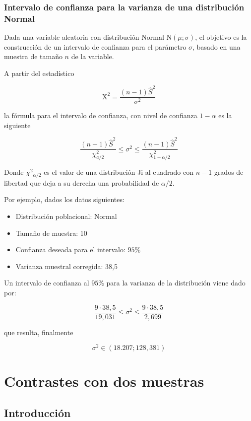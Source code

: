 \documentclass[
]{article}
\providecommand{\tightlist}{%
  \setlength{\itemsep}{0pt}\setlength{\parskip}{0pt}}
\begin{document}
\subsubsection{Intervalo de confianza para la varianza de una distribución Normal}\label{intervalo-de-confianza-para-la-varianza-de-una-distribuciuxf3n-normal-1}

Dada una variable aleatoria con distribución Normal \(\mathrm{N}(\mu ; \sigma)\), el objetivo es la construcción de un intervalo de confianza para el parámetro \(\sigma\), basado en una muestra de tamaño \(n\) de la variable.

A partir del estadístico

\[
\mathrm{X}^{2}=\frac{(n-1) \hat{S}^{2}}{\sigma^{2}}
\]

la fórmula para el intervalo de confianza, con nivel de confianza \(1-\alpha\) es la siguiente

\[
\frac{(n-1) \hat{S}^{2}}{\chi_{a / 2}^{2}} \leq \sigma^{2} \leq \frac{(n-1) \hat{S}^{2}}{\chi_{1-\alpha / 2}^{2}}
\]

Donde \(\chi^{2}{ }_{\alpha / 2}\) es el valor de una distribución Ji al cuadrado con \(n-1\) grados de libertad que deja a su derecha una probabilidad de \(\alpha / 2\).

Por ejemplo, dados los datos siguientes:

\begin{itemize}
\tightlist
\item
  Distribución poblacional: Normal
\item
  Tamaño de muestra: 10
\item
  Confianza deseada para el intervalo: \(95 \%\)
\item
  Varianza muestral corregida: 38,5
\end{itemize}

Un intervalo de confianza al \(95 \%\) para la varianza de la distribución viene dado por:

\[
\frac{9 \cdot 38,5}{19,031} \leq \sigma^{2} \leq \frac{9 \cdot 38,5}{2,699}
\]

que resulta, finalmente

\[
\sigma^{2} \in(18.207 ; 128,381)
\]

\section{Contrastes con dos muestras}\label{contrastes-con-dos-muestras}

\subsection{Introducción}\label{introducciuxf3n-7}
\end{document}
